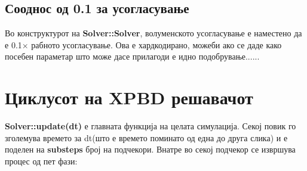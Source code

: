 \subsection{Сооднос од 0.1 за усогласување}
Во конструктурот на \textbf{Solver::Solver}, волуменското усогласување е наместено да е 0.1$\times$ рабното усогласување. Ова е хардкодирано, можеби ако се даде како посебен параметар што може дасе прилагоди е идно подобрување......


\section{Циклусот на XPBD решавачот}
\textbf{Solver::update(dt)} е главната функција на целата симулација. Секој повик го зголемува времето за dt(што е времето поминато од една до друга слика) и е поделен на \textbf{substeps} број на подчекори. Внатре во секој подчекор се извршува процес од пет фази:

